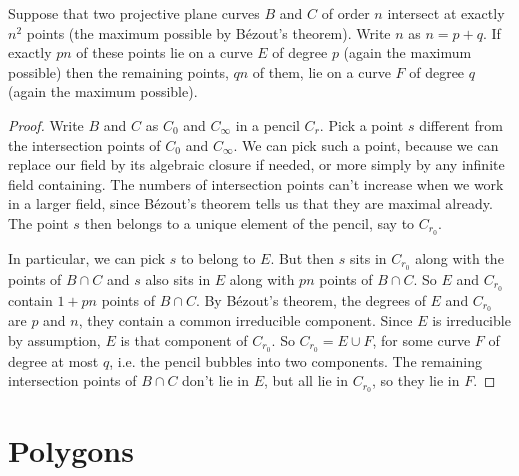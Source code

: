 \begin{lemma}\label{lemma:bubble}
Suppose that two projective plane curves \(B\) and \(C\) of order \(n\) intersect at exactly \(n^2\) points (the maximum possible by B\'ezout's theorem).
Write \(n\) as \(n=p+q\).
If exactly \(pn\) of these points lie on a curve \(E\) of degree \(p\) (again the maximum possible) then the remaining points, \(qn\) of them, lie on a curve \(F\) of degree \(q\) (again the maximum possible).
\end{lemma}
\begin{proof}
Write \(B\) and \(C\) as \(C_0\) and \(C_{\infty}\) in a pencil \(C_r\).
Pick a point \(s\) different from the intersection points of \(C_0\) and \(C_{\infty}\).
We can pick such a point, because we can replace our field by its algebraic closure if needed, or more simply by any infinite field containing.
The numbers of intersection points can't increase when we work in a larger field, since B\'ezout's theorem tells us that they are maximal already.
The point \(s\) then belongs to a unique element of the pencil, say to \(C_{r_0}\).

In particular, we can pick \(s\) to belong to \(E\).
But then \(s\) sits in \(C_{r_0}\) along with the points of \(B \cap C\) and \(s\) also sits in \(E\) along with \(pn\) points of \(B \cap C\).
So \(E\) and \(C_{r_0}\) contain \(1+pn\) points of \(B \cap C\).
By B\'ezout's theorem, the degrees of \(E\) and \(C_{r_0}\) are \(p\) and \(n\), they contain a common irreducible component.
Since \(E\) is irreducible by assumption, \(E\) is that component of \(C_{r_0}\).
So \(C_{r_0} = E \cup F\), for some curve \(F\) of degree at most \(q\), i.e. the pencil bubbles into two components.
The remaining intersection points of \(B \cap C\) don't lie in \(E\), but all lie in \(C_{r_0}\), so they lie in \(F\).
\end{proof}




\section{Polygons}\label{section:polygons}

